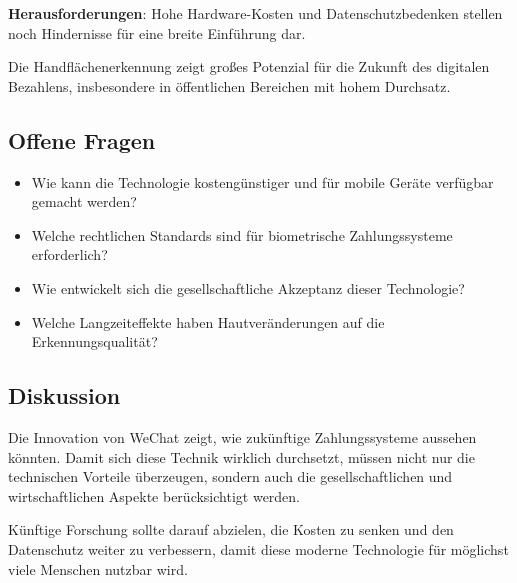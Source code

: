 \documentclass[paper=a4,fontsize=12pt,ngerman]{scrartcl}
\begin{document}
\textbf{Herausforderungen}: Hohe Hardware-Kosten und Datenschutzbedenken stellen noch Hindernisse für eine breite Einführung dar.

Die Handflächenerkennung zeigt großes Potenzial für die Zukunft des digitalen Bezahlens, insbesondere in öffentlichen Bereichen mit hohem Durchsatz.

\vspace{1.5cm}

\subsection{Offene Fragen}
\begin{itemize}
  \item Wie kann die Technologie kostengünstiger und für mobile Geräte verfügbar gemacht werden?
  \item Welche rechtlichen Standards sind für biometrische Zahlungssysteme erforderlich?
  \item Wie entwickelt sich die gesellschaftliche Akzeptanz dieser Technologie?
  \item Welche Langzeiteffekte haben Hautveränderungen auf die Erkennungsqualität?
\end{itemize}

\vspace{1.5cm}

\subsection{Diskussion}
Die Innovation von WeChat zeigt, wie zukünftige Zahlungssysteme aussehen könnten. Damit sich diese Technik wirklich durchsetzt, müssen nicht nur die technischen Vorteile überzeugen, sondern auch die gesellschaftlichen und wirtschaftlichen Aspekte berücksichtigt werden.

Künftige Forschung sollte darauf abzielen, die Kosten zu senken und den Datenschutz weiter zu verbessern, damit diese moderne Technologie für möglichst viele Menschen nutzbar wird.

\clearpage
\renewcommand\refname{Literaturverzeichnis}


\end{document}
